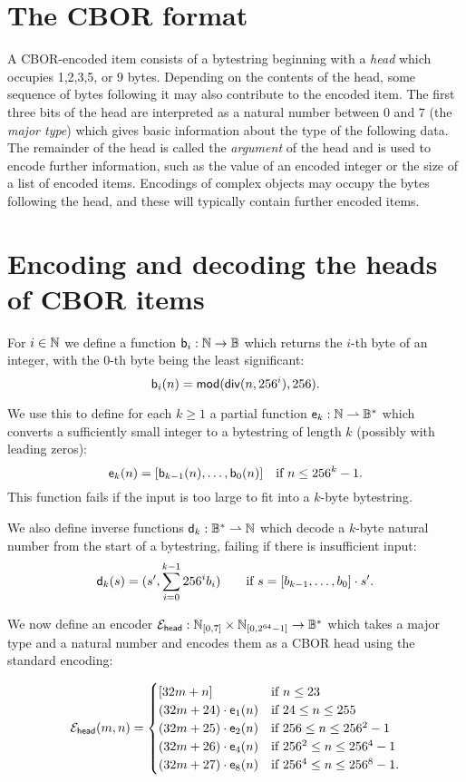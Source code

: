 \section{The CBOR format}
A CBOR-encoded item consists of a bytestring beginning with a \textit{head}
which occupies 1,2,3,5, or 9 bytes.  Depending on the contents of the head, some
sequence of bytes following it may also contribute to the encoded item. The
first three bits of the head are interpreted as a natural number between 0 and 7
(the \textit{major type}) which gives basic information about the type of the
following data.  The remainder of the head is called the \textit{argument} of the
head and is used to encode further information, such as the value of an encoded
integer or the size of a list of encoded items.  Encodings of complex objects
may occupy the bytes following the head, and these will typically contain
further encoded items.

\section{Encoding and decoding the heads of CBOR items}
For $i \in \mathbb{N}$ we define a function $\mathsf{b}_i: \mathbb{N} \rightarrow \mathbb{B}$ which returns
the $i$-th byte of an integer, with the 0-th byte being the least significant:
$$
  \mathsf{b}_i(n) = \operatorname{\mathsf{mod}}(\operatorname{\mathsf{div}}(n,256^i), 256).
$$

\noindent We use this to define for each $k \geq 1$ a partial function
$\mathsf{e}_k: \mathbb{N} \rightharpoonup \mathbb{B}^*$ which converts a sufficiently small
integer to a bytestring of length $k$ (possibly with leading zeros):
$$
\mathsf{e}_k(n) = [\mathsf{b}_{k-1}(n), \ldots, \mathsf{b}_0(n)]  \quad \text {if $n \leq 256^k-1$}.
$$
\noindent
This function fails if the input is too large to fit into a $k$-byte
bytestring.

We also define inverse functions $\mathsf{d}_k: \mathbb{B}^* \rightharpoonup \mathbb{N}$ which
decode a $k$-byte natural number from the start of a bytestring, failing if
there is insufficient input:
$$ \mathsf{d}_k(s) = (s', \sum_{i=0}^{k-1}256^ib_i) \qquad \text{if $s = [b_{k-1},
    \ldots, b_0] \cdot s'$}.
$$

\noindent We now define an encoder $\mathcal{E}_{\mathsf{head}}: \mathbb{N}_{[0,7]} \times
\mathbb{N}_{[0,2^{64}-1]} \rightarrow \mathbb{B}^*$ which takes a major type and a
natural number and encodes them as a CBOR head using the standard encoding:

$$
  \mathcal{E}_{\mathsf{head}}(m,n) =
  \begin{cases}
    [32m + n] & \text{if $n \leq 23$}\\
    (32m+24) \cdot \mathsf{e}_1(n) & \text{if $24 \leq n \leq 255$}\\
    (32m+25) \cdot \mathsf{e}_2(n) & \text{if $256 \leq n \leq 256^2-1$}\\
    (32m+26) \cdot \mathsf{e}_4(n)& \text{if $256^2 \leq n \leq 256^4-1$}\\
    (32m+27) \cdot \mathsf{e}_8(n) & \text{if $256^4 \leq n \leq 256^8-1$}.
  \end{cases}
$$

